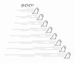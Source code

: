 \documentclass[12pt,oneside]{article}
\begin{document}
$$\xrightswishingghost{\xrightswishingghost{\xrightswishingghost{\xrightswishingghost{\xrightswishingghost{\xrightswishingghost{\xrightswishingghost{\xrightswishingghost{BOO!}}}}}}}}$$
\end{document}
